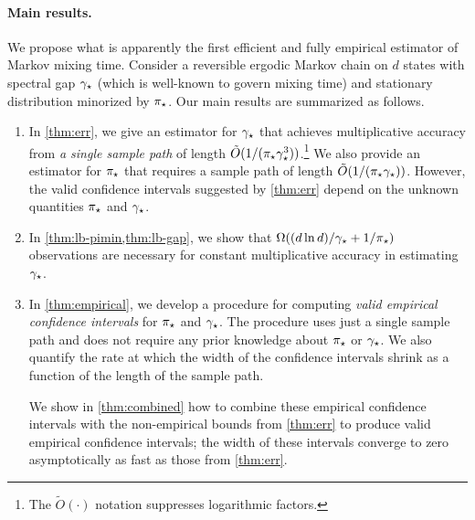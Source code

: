 \paragraph{Main results.}
We propose what is apparently the first efficient and fully empirical
estimator of Markov mixing time.
Consider a reversible ergodic Markov chain on $d$ states with spectral
gap $\gamma_{\star}$ (which is well-known to govern mixing time)
and stationary distribution minorized by $\pi_{\star}$.
Our main results are summarized as follows.
\begin{enumerate}
  \item
    In \cref{thm:err}, we give an estimator for $\gamma_{\star}$ that
    achieves multiplicative accuracy from \emph{a single sample path}
    of length $\tilde{O}(1/(\pi_{\star}\gamma_{\star}^3))$.\footnote{The
    $\tilde{O}(\cdot)$ notation suppresses logarithmic factors.}
    We also provide an estimator for $\pi_{\star}$ that requires a sample
    path of length $\tilde{O}(1/(\pi_{\star}\gamma_{\star}))$.
    However, the valid confidence intervals suggested by
    \cref{thm:err} depend on the unknown quantities $\pi_{\star}$ and
    $\gamma_{\star}$.

  \item
    In \cref{thm:lb-pimin,thm:lb-gap}, we show that $\Omega(
    (d\ln d)/\gamma_{\star} + 1/\pi_{\star} )$ observations are necessary for
    constant multiplicative accuracy in estimating $\gamma_{\star}$.

  \item
    In \cref{thm:empirical}, we develop a procedure for computing
    \emph{valid empirical confidence intervals} for $\pi_{\star}$ and
    $\gamma_{\star}$.
    The procedure uses just a single sample path and does not require
    any prior knowledge about $\pi_{\star}$ or $\gamma_{\star}$.
    We also quantify the rate at which the width of the confidence
    intervals shrink as a function of the length of the sample path.

    We show in \cref{thm:combined} how to combine these empirical
    confidence intervals with the non-empirical bounds from
    \cref{thm:err} to produce valid empirical confidence intervals;
    the width of these intervals converge to zero asymptotically as
    fast as those from \cref{thm:err}.



    

\end{enumerate}



